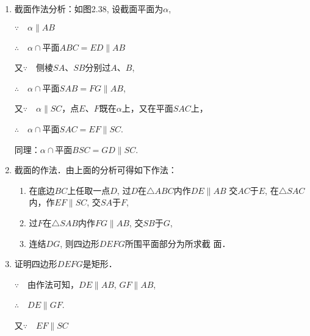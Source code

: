\begin{figure}[htp]
    \centering
{}
    \caption{}
\end{figure}

\begin{solution}
\begin{enumerate}
    \item 截面作法分析：如图2.38, 设截面平面为$\alpha$, 
    
$\because\quad \alpha\parallel AB$

$\therefore\quad \alpha\cap$平面$ABC=ED\parallel AB$

又$\because\quad $侧棱$SA$、$SB$分别过$A$、$B$,

$\therefore\quad \alpha\cap$平面$SAB=FG\parallel AB$,

又$\because\quad \alpha\parallel SC$，点$E$、$F$既在$\alpha$上，又在平面$SAC$上，

$\therefore\quad \alpha\cap$平面$SAC=EF\parallel SC$.

同理：$\alpha\cap$平面$BSC=GD\parallel SC$.

\item 截面的作法．由上面的分析可得如下作法：
\begin{enumerate}
    \item 在底边$BC$上任取一点$D$, 过$D$在$\triangle ABC$内作$DE\parallel AB$
    交$AC$于$E$, 在$\triangle SAC$内，作$EF\parallel SC$, 交$SA$于$F$,
    \item  过$F$在$\triangle SAB$内作$FG\parallel AB$, 交$SB$于$G$, 
    \item 连结$DG$, 则四边形$DEFG$所围平面部分为所求截
    面．
\end{enumerate}

\item 证明四边形$DEFG$是矩形．


$\because\quad $由作法可知，$DE\parallel AB$, $GF\parallel AB$, 

$\therefore\quad DE\parallel GF$.

又$\because\quad EF\parallel SC$


\end{enumerate}
\end{solution}
